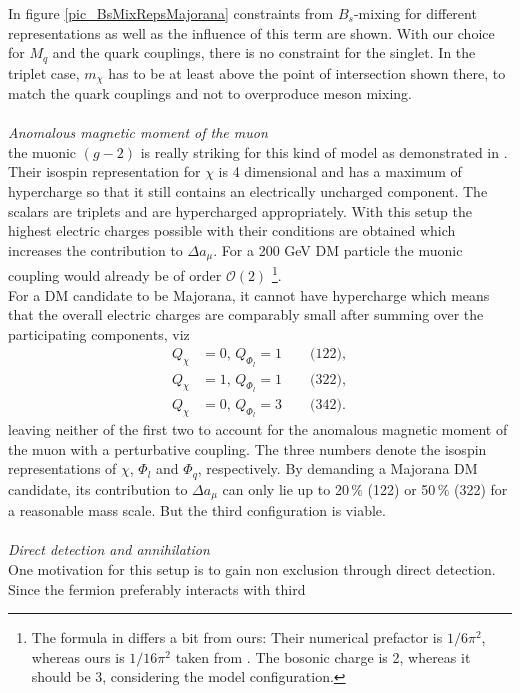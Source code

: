In figure \ref{pic_BsMixRepsMajorana} constraints from $B_s$-mixing for different representations as well as the influence of this term are shown.
With our choice for $M_q$ and the quark couplings, there is no constraint for the singlet. In the triplet case, $m_\chi$ has to be at
least above the point of intersection shown there, to match the quark couplings and not to overproduce meson mixing.
\\ \\ \textit{Anomalous magnetic moment of the muon}\\
\noindent the muonic $(g-2)$ is really striking for this kind of model as demonstrated in \cite{Grip}. Their isospin representation for $\chi$ is
4 dimensional and has a maximum of hypercharge so that it still contains an electrically uncharged component. The scalars are triplets and 
are hypercharged appropriately. With this setup the highest electric charges possible with their conditions are obtained which increases the 
contribution to $\Delta a_\mu$. For a 200 GeV DM particle the muonic coupling would already be of order $\mathcal{O}(2)$ \footnote[4]{The 
formula in \cite{Grip} differs a bit from ours: Their numerical prefactor is $1/6\pi^2$, whereas ours is $1/16\pi^2$ taken from \cite{Lavoura}.
The bosonic charge is 2, whereas it should be 3, considering the model configuration.}.\\
\noindent For a DM candidate to be Majorana, it cannot have hypercharge which means that the overall electric charges are comparably small
after summing over the participating components, viz
\begin{align}
 Q_\chi &= 0,\,Q_{\Phi_l} = 1 \qquad \text{(122)},\\
 Q_\chi &= 1,\,Q_{\Phi_l} = 1 \qquad \text{(322)},\\
 Q_\chi &= 0,\,Q_{\Phi_l} = 3 \qquad \text{(342)}.
\end{align}
leaving neither of the first two to account for the anomalous magnetic moment of the muon with a perturbative coupling. The three numbers denote
the isospin representations of $\chi$, $\Phi_l$ and $\Phi_q$, respectively. By demanding a Majorana DM candidate, its contribution to 
$\Delta a_\mu$ can only lie up to 20$\,\%$ (122) or 50$\,\%$ (322) for a reasonable 
mass scale. But the third configuration is viable.
\\ \\ \textit{Direct detection and annihilation}\\
\noindent One motivation for this setup is to gain non exclusion through direct detection. Since the fermion preferably interacts with third 
